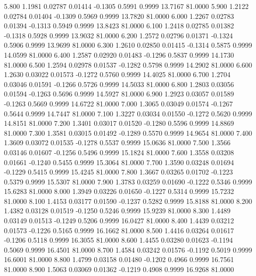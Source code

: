   5.800   1.1981   0.02787   0.01414  -0.1305   0.5991   0.9999  13.7167  81.0000
   5.900   1.2122   0.02784   0.01404  -0.1309   0.5969   0.9999  13.7820  81.0000
   6.000   1.2267   0.02783   0.01394  -0.1313   0.5949   0.9999  13.8423  81.0000
   6.100   1.2418   0.02785   0.01382  -0.1318   0.5928   0.9999  13.9032  81.0000
   6.200   1.2572   0.02796   0.01371  -0.1324   0.5906   0.9999  13.9699  81.0000
   6.300   1.2610   0.02850   0.01415  -0.1314   0.5875   0.9999  14.0599  81.0000
   6.400   1.2587   0.02920   0.01483  -0.1296   0.5837   0.9999  14.1730  81.0000
   6.500   1.2594   0.02978   0.01537  -0.1282   0.5798   0.9999  14.2902  81.0000
   6.600   1.2630   0.03022   0.01573  -0.1272   0.5760   0.9999  14.4025  81.0000
   6.700   1.2704   0.03046   0.01591  -0.1266   0.5726   0.9999  14.5033  81.0000
   6.800   1.2803   0.03056   0.01594  -0.1263   0.5696   0.9999  14.5927  81.0000
   6.900   1.2923   0.03057   0.01589  -0.1263   0.5669   0.9999  14.6722  81.0000
   7.000   1.3065   0.03049   0.01574  -0.1267   0.5644   0.9999  14.7447  81.0000
   7.100   1.3227   0.03034   0.01550  -0.1272   0.5620   0.9999  14.8151  81.0000
   7.200   1.3401   0.03017   0.01520  -0.1280   0.5596   0.9999  14.8869  81.0000
   7.300   1.3581   0.03015   0.01492  -0.1289   0.5570   0.9999  14.9654  81.0000
   7.400   1.3609   0.03072   0.01535  -0.1278   0.5537   0.9999  15.0636  81.0000
   7.500   1.3566   0.03146   0.01607  -0.1256   0.5496   0.9999  15.1824  81.0000
   7.600   1.3558   0.03208   0.01661  -0.1240   0.5455   0.9999  15.3064  81.0000
   7.700   1.3590   0.03248   0.01694  -0.1229   0.5415   0.9999  15.4245  81.0000
   7.800   1.3667   0.03265   0.01702  -0.1223   0.5379   0.9999  15.5307  81.0000
   7.900   1.3783   0.03259   0.01690  -0.1222   0.5346   0.9999  15.6283  81.0000
   8.000   1.3949   0.03226   0.01650  -0.1227   0.5314   0.9999  15.7232  81.0000
   8.100   1.4153   0.03177   0.01590  -0.1237   0.5282   0.9999  15.8188  81.0000
   8.200   1.4382   0.03128   0.01519  -0.1250   0.5246   0.9999  15.9239  81.0000
   8.300   1.4489   0.03149   0.01513  -0.1249   0.5206   0.9999  16.0427  81.0000
   8.400   1.4439   0.03212   0.01573  -0.1226   0.5165   0.9999  16.1662  81.0000
   8.500   1.4416   0.03264   0.01617  -0.1206   0.5118   0.9999  16.3055  81.0000
   8.600   1.4455   0.03280   0.01623  -0.1194   0.5069   0.9999  16.4501  81.0000
   8.700   1.4584   0.03242   0.01576  -0.1192   0.5019   0.9999  16.6001  81.0000
   8.800   1.4799   0.03158   0.01480  -0.1202   0.4966   0.9999  16.7561  81.0000
   8.900   1.5063   0.03069   0.01362  -0.1219   0.4908   0.9999  16.9268  81.0000
